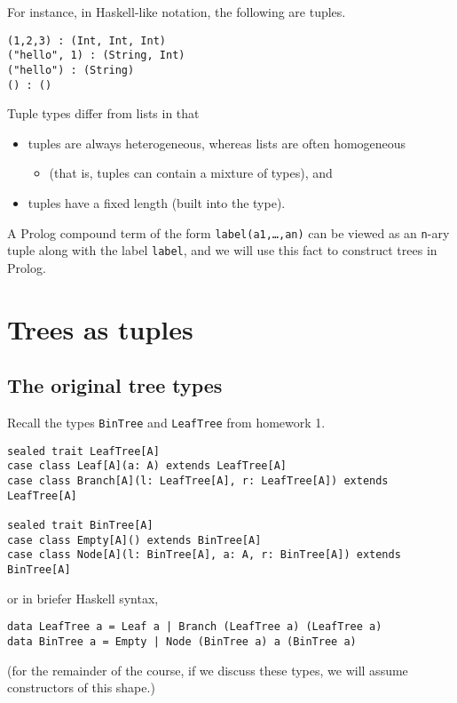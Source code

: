 \documentclass[11pt]{article}
\begin{document}
For instance, in Haskell-like notation, the following are tuples.
\begin{verbatim}
(1,2,3) : (Int, Int, Int)
("hello", 1) : (String, Int)
("hello") : (String)
() : ()
\end{verbatim}

Tuple types differ from lists in that
\begin{itemize}
\item tuples are always heterogeneous,
whereas lists are often homogeneous
\begin{itemize}
\item (that is, tuples can contain a mixture of types), and
\end{itemize}
\item tuples have a fixed length (built into the type).
\end{itemize}

A Prolog compound term of the form \texttt{label(a1,…,an)} can be viewed
as an \texttt{n}-ary tuple along with the label \texttt{label},
and we will use this fact to construct trees in Prolog.

\section{Trees as tuples}
\label{sec:org0176e6e}
\subsection{The original tree types}
\label{sec:orgdc1e360}
Recall the types \texttt{BinTree} and \texttt{LeafTree} from homework 1.
\begin{verbatim}
sealed trait LeafTree[A]
case class Leaf[A](a: A) extends LeafTree[A]
case class Branch[A](l: LeafTree[A], r: LeafTree[A]) extends LeafTree[A]

sealed trait BinTree[A]
case class Empty[A]() extends BinTree[A]
case class Node[A](l: BinTree[A], a: A, r: BinTree[A]) extends BinTree[A]
\end{verbatim}
or in briefer Haskell syntax,
\begin{verbatim}
data LeafTree a = Leaf a | Branch (LeafTree a) (LeafTree a)
data BinTree a = Empty | Node (BinTree a) a (BinTree a)
\end{verbatim}
(for the remainder of the course, if we discuss these types,
we will assume constructors of this shape.)
\end{document}
